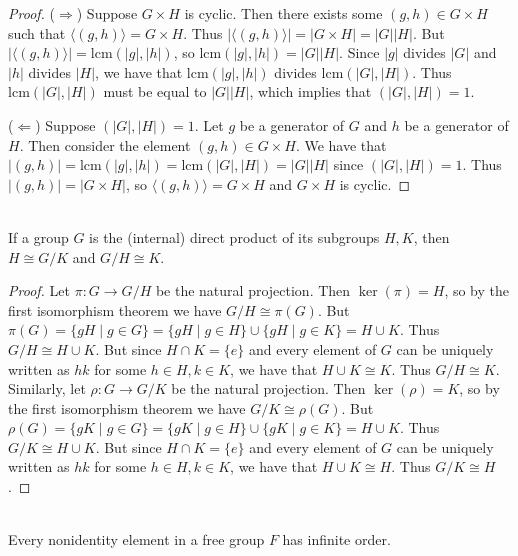 \documentclass{article}
\begin{document}
\begin{proof}
    ($\Rightarrow$) Suppose $G \times H$ is cyclic. Then there exists some $(g, h) \in G \times H$ such that $\langle (g, h) \rangle = G \times H$. Thus $|\langle (g, h) \rangle| = |G \times H| = |G||H|$. But $|\langle (g, h) \rangle| = \mathrm{lcm}(|g|, |h|)$, so $\mathrm{lcm}(|g|, |h|) = |G||H|$. Since $|g|$ divides $|G|$ and $|h|$ divides $|H|$, we have that $\mathrm{lcm}(|g|, |h|)$ divides $\mathrm{lcm}(|G|, |H|)$. Thus $\mathrm{lcm}(|G|, |H|)$ must be equal to $|G||H|$, which implies that $(|G|, |H|) = 1$.

    ($\Leftarrow$) Suppose $(|G|, |H|) = 1$. Let $g$ be a generator of $G$ and $h$ be a generator of $H$. Then consider the element $(g, h) \in G \times H$. We have that $|(g, h)| = \mathrm{lcm}(|g|, |h|) = \mathrm{lcm}(|G|, |H|) = |G||H|$ since $(|G|, |H|) = 1$. Thus $|(g, h)| = |G \times H|$, so $\langle (g, h) \rangle = G \times H$ and $G \times H$ is cyclic.
\end{proof}



\begin{problem}[1.8.9] \\ 
    If a group $G$ is the (internal) direct product of its subgroups $H, K$, then $H \cong G/K$ and $G/H \cong K$.
\end{problem}


\begin{proof}
    Let \(\pi: G \to G/H\) be the natural projection. Then \(\ker(\pi) = H\), so by the first isomorphism theorem we have \(G/H \cong \pi(G)\). But \(\pi(G) = \{gH \mid g \in G\} = \{gH \mid g \in H\} \cup \{gH \mid g \in K\} = H \cup K\). Thus \(G/H \cong H \cup K\). But since \(H \cap K = \{e\}\) and every element of \(G\) can be uniquely written as \(hk\) for some \(h \in H, k \in K\), we have that \(H \cup K \cong K\). Thus \(G/H \cong K\). Similarly, let \(\rho: G \to G/K\) be the natural projection. Then \(\ker(\rho) = K\), so by the first isomorphism theorem we have \(G/K \cong \rho(G)\). But \(\rho(G) = \{gK \mid g \in G\} = \{gK \mid g \in H\} \cup \{gK \mid g \in K\} = H \cup K\). Thus \(G/K \cong H \cup K\). But since \(H \cap K = \{e\}\) and every element of \(G\) can be uniquely written as \(hk\) for some \(h \in H, k \in K\), we have that \(H \cup K \cong H\). Thus \(G/K \cong H\).
\end{proof}


\newpage

\begin{problem}[1.9.1] \\ 
    Every nonidentity element in a free group $F$ has infinite order.
\end{problem}
\end{document}
